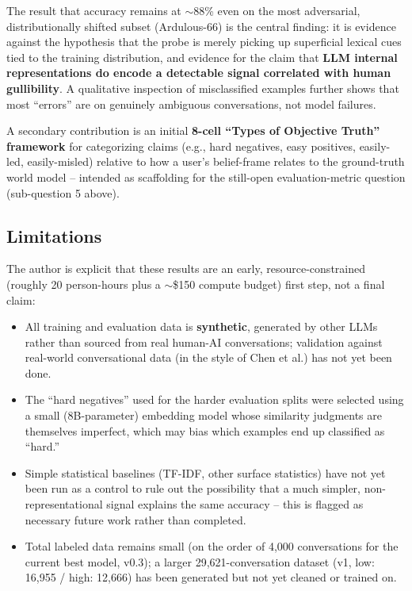 \documentclass[11pt]{article}
\begin{document}
The result that accuracy remains at $\sim$88\% even on the most adversarial, distributionally shifted subset (Ardulous-66) is the central finding: it is evidence against the hypothesis that the probe is merely picking up superficial lexical cues tied to the training distribution, and evidence for the claim that \textbf{LLM internal representations do encode a detectable signal correlated with human gullibility}. A qualitative inspection of misclassified examples further shows that most ``errors'' are on genuinely ambiguous conversations, not model failures.

A secondary contribution is an initial \textbf{8-cell ``Types of Objective Truth'' framework} for categorizing claims (e.g., hard negatives, easy positives, easily-led, easily-misled) relative to how a user's belief-frame relates to the ground-truth world model -- intended as scaffolding for the still-open evaluation-metric question (sub-question 5 above).

\subsection*{Limitations}

The author is explicit that these results are an early, resource-constrained (roughly 20 person-hours plus a $\sim$\$150 compute budget) first step, not a final claim:

\begin{itemize}[nosep]
    \item All training and evaluation data is \textbf{synthetic}, generated by other LLMs rather than sourced from real human-AI conversations; validation against real-world conversational data (in the style of Chen et al.) has not yet been done.
    \item The ``hard negatives'' used for the harder evaluation splits were selected using a small (8B-parameter) embedding model whose similarity judgments are themselves imperfect, which may bias which examples end up classified as ``hard.''
    \item Simple statistical baselines (TF-IDF, other surface statistics) have not yet been run as a control to rule out the possibility that a much simpler, non-representational signal explains the same accuracy -- this is flagged as necessary future work rather than completed.
    \item Total labeled data remains small (on the order of 4,000 conversations for the current best model, v0.3); a larger 29,621-conversation dataset (v1, low: 16,955 / high: 12,666) has been generated but not yet cleaned or trained on.
\end{itemize}
\end{document}
